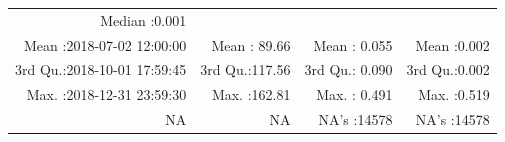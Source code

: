 \documentclass[
  10pt,
  a4paper,oneside]{article}
\begin{document}
\begin{longtable}[]{@{}rrrr@{}}
\begin{minipage}[t]{0.19\columnwidth}
Median :0.001\strut
\end{minipage}\tabularnewline
\begin{minipage}[t]{0.33\columnwidth}\raggedleft
Mean :2018-07-02 12:00:00\strut
\end{minipage} & \begin{minipage}[t]{0.19\columnwidth}\raggedleft
Mean : 89.66\strut
\end{minipage} & \begin{minipage}[t]{0.19\columnwidth}\raggedleft
Mean : 0.055\strut
\end{minipage} & \begin{minipage}[t]{0.19\columnwidth}\raggedleft
Mean :0.002\strut
\end{minipage}\tabularnewline
\begin{minipage}[t]{0.33\columnwidth}\raggedleft
3rd Qu.:2018-10-01 17:59:45\strut
\end{minipage} & \begin{minipage}[t]{0.19\columnwidth}\raggedleft
3rd Qu.:117.56\strut
\end{minipage} & \begin{minipage}[t]{0.19\columnwidth}\raggedleft
3rd Qu.: 0.090\strut
\end{minipage} & \begin{minipage}[t]{0.19\columnwidth}\raggedleft
3rd Qu.:0.002\strut
\end{minipage}\tabularnewline
\begin{minipage}[t]{0.33\columnwidth}\raggedleft
Max. :2018-12-31 23:59:30\strut
\end{minipage} & \begin{minipage}[t]{0.19\columnwidth}\raggedleft
Max. :162.81\strut
\end{minipage} & \begin{minipage}[t]{0.19\columnwidth}\raggedleft
Max. : 0.491\strut
\end{minipage} & \begin{minipage}[t]{0.19\columnwidth}\raggedleft
Max. :0.519\strut
\end{minipage}\tabularnewline
\begin{minipage}[t]{0.33\columnwidth}\raggedleft
NA\strut
\end{minipage} & \begin{minipage}[t]{0.19\columnwidth}\raggedleft
NA\strut
\end{minipage} & \begin{minipage}[t]{0.19\columnwidth}\raggedleft
NA's :14578\strut
\end{minipage} & \begin{minipage}[t]{0.19\columnwidth}\raggedleft
NA's :14578\strut
\end{minipage}\tabularnewline
\bottomrule
\end{longtable}
\end{document}
